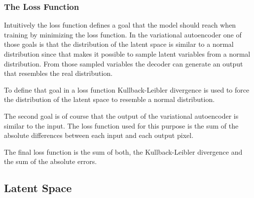 \subsubsection{The Loss Function}

Intuitively the loss function defines a goal that the model should reach when training by minimizing
the loss function. In the variational autoencoder one of those goals is that the distribution of the 
latent space is similar to a normal distribution since that makes it possible to sample latent 
variables from a normal distribution. From those sampled variables the decoder can generate an output
that resembles the real distribution.

To define that goal in a loss function Kullback-Leibler divergence is used to force the distribution
of the latent space to resemble a normal distribution.

The second goal is of course that the output of the variational autoencoder is similar to the input.
The loss function used for this purpose is the sum of the absolute differences between each input and
each output pixel.

The final loss function is the sum of both, the Kullback-Leibler divergence and the sum of the absolute
errors.

\subsection{Latent Space}